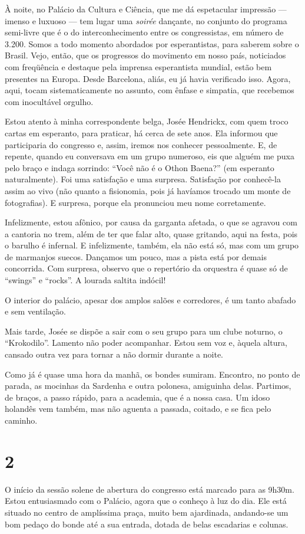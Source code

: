 À noite, no Palácio da Cultura e Ciência, que me dá espetacular impressão --- imenso e luxuoso --- tem lugar uma \textit{soirée} dançante, no conjunto do programa semi-livre que é o do interconhecimento entre os congressistas, em número de 3.200. Somos a todo momento abordados por esperantistas, para saberem sobre o Brasil. Vejo, então, que os progressos do movimento em nosso país, noticiados com freqüência e destaque pela imprensa esperantista mundial, estão bem presentes na Europa. Desde Barcelona, aliás, eu já havia verificado isso. Agora, aqui, tocam sistematicamente no assunto, com ênfase e simpatia, que recebemos com inocultável orgulho.

Estou atento à minha correspondente belga, Josée Hendrickx, com quem troco cartas em esperanto, para praticar, há cerca de sete anos. Ela informou que participaria do congresso e, assim, iremos nos conhecer pessoalmente. E, de repente, quando eu conversava em um grupo numeroso, eis que alguém me puxa pelo braço e indaga sorrindo: ``Você não é o Othon Baena?'' (em esperanto naturalmente). Foi uma satisfação e uma surpresa. Satisfação por conhecê-la assim ao vivo (não quanto a fisionomia, pois já havíamos trocado um monte de fotografias). E surpresa, porque ela pronunciou meu nome corretamente.

Infelizmente, estou afônico, por causa da garganta afetada, o que se agravou com a cantoria no trem, além de ter que falar alto, quase gritando, aqui na festa, pois o barulho é infernal. E infelizmente, também, ela não está só, mas com um grupo de marmanjos suecos. Dançamos um pouco, mas a pista está por demais concorrida. Com surpresa, observo que o repertório da orquestra é quase só de ``swings'' e ``rocks''. A lourada saltita indócil!

O interior do palácio, apesar dos amplos salões e corredores, é um tanto abafado e sem ventilação.

Mais tarde, Josée se dispõe a sair com o seu grupo para um clube noturno, o ``Krokodilo''. Lamento não poder acompanhar. Estou sem voz e, àquela altura, cansado outra vez para tornar a não dormir durante a noite.

Como já é quase uma hora da manhã, os bondes sumiram. Encontro, no ponto de parada, as mocinhas da Sardenha e outra polonesa, amiguinha delas. Partimos, de braços, a passo rápido, para a academia, que é a nossa casa. Um idoso holandês vem também, mas não aguenta a passada, coitado, e se fica pelo caminho.

\section*{2 \adfflatleafright {}}
O início da sessão solene de abertura do congresso está marcado para as 9h30m. Estou entusiasmado com o Palácio, agora que o conheço à luz do dia. Ele está situado no centro de amplíssima praça, muito bem ajardinada, andando-se um bom pedaço do bonde até a sua entrada, dotada de belas escadarias e colunas.

